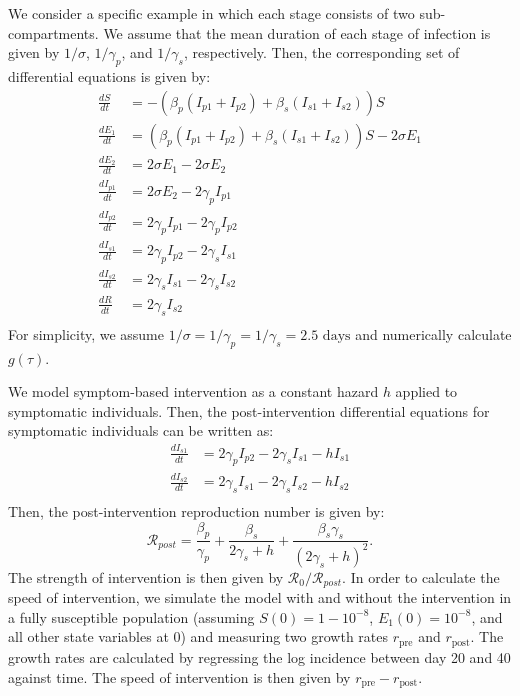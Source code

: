 \documentclass[12pt]{article}
\newcommand{\Rx}[1]{\ensuremath{{\mathcal R}_{#1}}}
\newcommand{\Ro}{\Rx{0}}
\newcommand{\Rpost}{\Rx{post}}
\newcommand{\rr}{\ensuremath{{r}}}
\newcommand{\rx}[1]{\ensuremath{\rr_{\mathrm{#1}}}}
\newcommand{\rpre}{\rx{pre}}
\newcommand{\rpost}{\rx{post}}
\begin{document}
We consider a specific example in which each stage consists of two sub-compartments.
We assume that the mean duration of each stage of infection is given by $1/\sigma$, $1/\gamma_p$, and $1/\gamma_s$, respectively.
Then, the corresponding set of differential equations is given by:
\begin{equation}
\begin{aligned}
\frac{dS}{dt} &= - \left(\beta_p (I_{p1} + I_{p2}) + \beta_s (I_{s1} + I_{s2})\right) S \\
\frac{dE_1}{dt} &=   \left(\beta_p (I_{p1} + I_{p2}) + \beta_s (I_{s1} + I_{s2})\right) S - 2 \sigma E_1 \\
\frac{dE_2}{dt} &= 2 \sigma E_1 - 2 \sigma E_2\\
\frac{dI_{p1}}{dt} &= 2 \sigma E_2 - 2 \gamma_p I_{p1}\\
\frac{dI_{p2}}{dt} &= 2 \gamma_p I_{p1} - 2 \gamma_p I_{p2}\\
\frac{dI_{s1}}{dt} &= 2 \gamma_p I_{p2} - 2 \gamma_s I_{s1}\\
\frac{dI_{s2}}{dt} &= 2 \gamma_s I_{s1} - 2 \gamma_s I_{s2}\\
\frac{dR}{dt} &= 2 \gamma_s I_{s2}\\
\end{aligned}
\end{equation}
For simplicity, we assume $1/\sigma = 1/\gamma_p = 1/\gamma_s = 2.5 \textrm{ days}$ and numerically calculate $g(\tau)$.

We model symptom-based intervention as a constant hazard $h$ applied to symptomatic individuals. Then, the post-intervention differential equations for symptomatic individuals can be written as:
\begin{equation}
\begin{aligned}
\frac{dI_{s1}}{dt} &= 2 \gamma_p I_{p2} - 2 \gamma_s I_{s1} - h I_{s1}\\
\frac{dI_{s2}}{dt} &= 2 \gamma_s I_{s1} - 2 \gamma_s I_{s2}  - h I_{s2}\\
\end{aligned}
\end{equation}
Then, the post-intervention reproduction number is given by:
\begin{equation}
\Rpost = \frac{\beta_p}{\gamma_p} + \frac{\beta_s}{2 \gamma_s + h} + \frac{\beta_s \gamma_s}{(2 \gamma_s + h)^2}.
\end{equation}
The strength of intervention is then given by $\Ro/\Rpost$.
In order to calculate the speed of intervention, we simulate the model with and without the intervention in a fully susceptible population (assuming $S(0) = 1-10^{-8}$, $E_1(0) = 10^{-8}$, and all other state variables at 0) and measuring two growth rates $\rpre$ and $\rpost$.
The growth rates are calculated by regressing the log incidence between day 20 and 40 against time.
The speed of intervention is then given by $\rpre - \rpost$.
\end{document}
